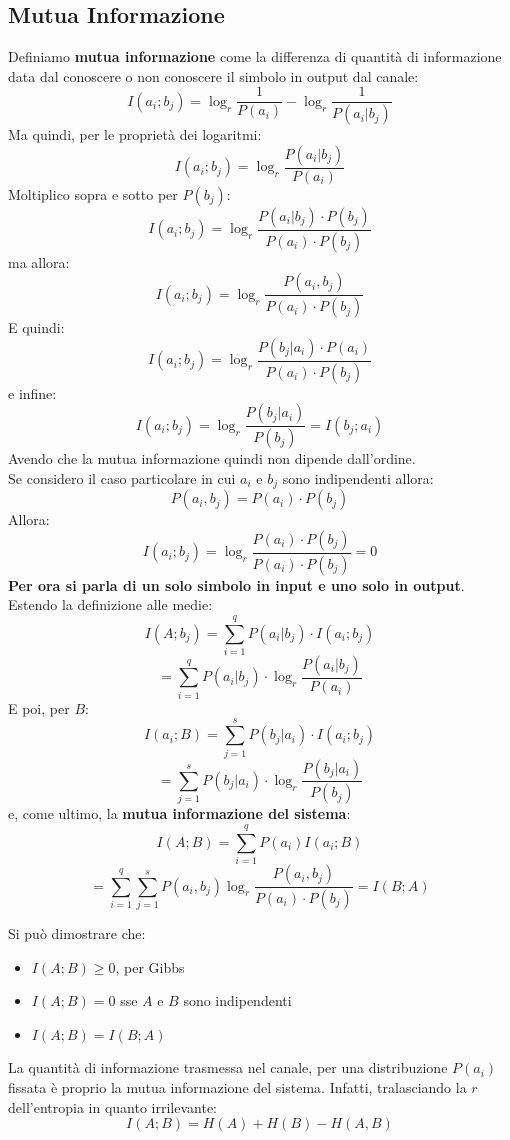 \documentclass[a4paper,12pt, oneside]{book}
\begin{document}
\subsection{Mutua Informazione}
\begin{definizione}
  Definiamo \textbf{mutua informazione} come la differenza di quantità di
  informazione data dal conoscere o non conoscere il simbolo in output dal
  canale:
  \[I(a_i;b_j)=\log_r \frac{1}{P(a_i)}-\log_r\frac{1}{P(a_i|b_j)}\]
  Ma quindi, per le proprietà dei logaritmi:
  \[I(a_i;b_j)=\log_r\frac{P(a_i|b_j)}{P(a_i)}\]
  Moltiplico sopra e sotto per $P(b_j)$:
  \[I(a_i;b_j)=\log_r\frac{P(a_i|b_j)\cdot P(b_j)}{P(a_i)\cdot P(b_j)}\]
  ma allora:
  \[I(a_i;b_j)=\log_r\frac{P(a_i,b_j)}{P(a_i)\cdot P(b_j)}\]
  E quindi:
  \[I(a_i;b_j)=\log_r\frac{P(b_j|a_i)\cdot P(a_i)}{P(a_i)\cdot P(b_j)}\]
  e infine:
  \[I(a_i;b_j)=\log_r\frac{P(b_j|a_i)}{P(b_j)}=I(b_j;a_i)\]
  Avendo che la mutua informazione quindi non dipende dall'ordine.\\
  Se considero il caso particolare in cui $a_i$ e $b_j$ sono indipendenti allora:
  \[P(a_i,b_j)=P(a_i)\cdot P(b_j)\]
  Allora:
  \[I(a_i;b_j)=\log_r\frac{P(a_i)\cdot P(b_j)}{P(a_i)\cdot P(b_j)}=0\]
  \textbf{Per ora si parla di un solo simbolo in input e uno solo in output}.\\
  Estendo la definizione alle medie:
  \[I(A;b_j)=\sum_{i=1}^q P(a_i|b_j)\cdot I(a_i;b_j)\]
  \[=\sum_{i=1}^q P(a_i|b_j)\cdot\log_r\frac{P(a_i|b_j)}{P(a_i)}\]
  E poi, per $B$:
  \[I(a_i;B)=\sum_{j=1}^s P(b_j|a_i)\cdot I(a_i;b_j)\]
  \[=\sum_{j=1}^s P(b_j|a_i)\cdot\log_r\frac{P(b_j|a_i)}{P(b_j)}\]
  e, come ultimo, la \textbf{mutua informazione del sistema}:
  \[I(A;B)=\sum_{i=1}^q P(a_i) I(a_i;B)\]
  \[=\sum_{i=1}^q\sum_{j=1}^s P(a_i,b_j)\log_r\frac{P(a_i,b_j)}{P(a_i)\cdot
      P(b_j)}=I(B;A)\]
\end{definizione}
\begin{teorema}
  Si può dimostrare che:
  \begin{itemize}
    \item $I(A;B)\geq 0$, per Gibbs
    \item $I(A;B)=0$ sse $A$ e $B$ sono indipendenti
    \item $I(A;B)=I(B;A)$
  \end{itemize}
\end{teorema}
La quantità di informazione trasmessa nel canale, per una distribuzione $P(a_i)$
fissata è proprio la mutua informazione del sistema. Infatti, tralasciando la
$r$ dell'entropia in quanto irrilevante:
\[I(A;B)=H(A)+H(B)-H(A,B)\]
\end{document}
